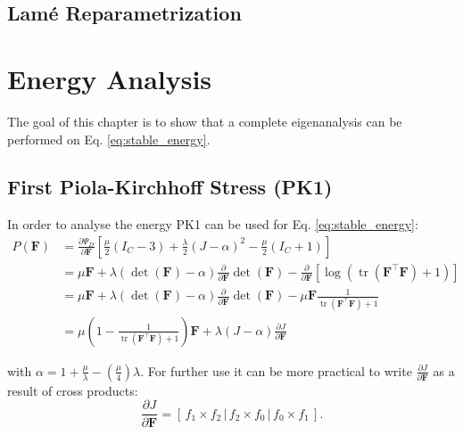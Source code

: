 
\subsection{Lamé Reparametrization}


\section{Energy Analysis}
The goal of this chapter is to show that a complete eigenanalysis can be performed on Eq. \ref{eq:stable_energy}.


\subsection{First Piola-Kirchhoff Stress (PK1)}
In order to analyse the energy PK1 can be used for Eq. \ref{eq:stable_energy}:
\begin{align*}
P(\mathbf{F}) &= \frac{\partial \Psi_{D}}{\partial \mathbf{F}} \left[ \frac{\mu}{2}\left(I_{C}-3\right) + \frac{\lambda}{2}(J-\alpha)^{2} - \frac{\mu}{2}\left(I_{C}+1\right) \right] \\
&= \mu \mathbf{F} + \lambda (\operatorname{det}(\mathbf{F})-\alpha)  \frac{\partial}{\partial \mathbf{F}} \operatorname{det}(\mathbf{F}) - \frac{\partial}{\partial \mathbf{F}} \left[\operatorname{log}\left(\operatorname{tr}(\mathbf{F}^\intercal \mathbf{F})+1\right)\right] \\
&= \mu \mathbf{F} + \lambda (\operatorname{det}(\mathbf{F})-\alpha)  \frac{\partial}{\partial \mathbf{F}} \operatorname{det}(\mathbf{F}) - \mu \mathbf{F} \frac{1}{\operatorname{tr}(\mathbf{F}^\intercal \mathbf{F}) + 1} \\
&= \mu \left( 1 - \frac{1}{\operatorname{tr}(\mathbf{F}^\intercal \mathbf{F}) + 1}\right) \mathbf{F} + \lambda(J-\alpha)\frac{\partial J}{\partial \mathbf{F}}
\end{align*}

with $\alpha=1+\frac{\mu}{\lambda}-\left(\frac{\mu}{4}\right)\lambda$. For further use it can be more practical to write $\frac{\partial J}{\partial \mathbf{F}}$ as a result of cross products:
\begin{equation}\label{eq:cross_product}
\frac{\partial J}{\partial \mathbf{F}} = \left[ \,f_1 \times f_2\, \bigg| \,f_2 \times f_0\, \bigg| \,f_0 \times f_1\, \right].
\end{equation}

